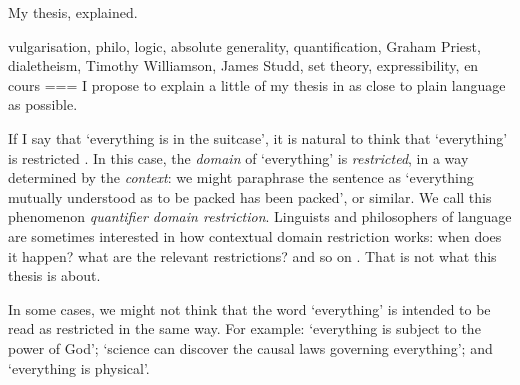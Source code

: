 My thesis, explained.

vulgarisation, philo, logic, absolute generality, quantification, Graham Priest, dialetheism, Timothy Williamson, James Studd, set theory, expressibility, en cours
===
I propose to explain a little of my thesis \parencite{loo2024} in as close to plain language as possible.

If I say that ‘everything is in the suitcase’, it is natural to think that ‘everything’ is restricted \parencite[this example is drawn from][]{williamson2003}. In this case, the \emph{domain} of `everything' is \emph{restricted}, in a way determined by the \emph{context}: we might paraphrase the sentence as ‘everything mutually understood as to be packed has been packed’, or similar. We call this phenomenon \emph{quantifier domain restriction}. Linguists and philosophers of language are sometimes interested in how contextual domain restriction works: when does it happen? what are the relevant restrictions? and so on \parencite{stanley2000}. That is not what this thesis is about.

In some cases, we might not think that the word ‘everything’ is intended to be read as restricted in the same way. For example: `everything is subject to the power of God’; `science can discover the causal laws governing everything’; and ‘everything is physical’.
